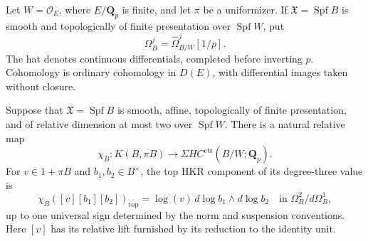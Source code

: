 Let $W=\mathcal O_E$, where $E/\mathbf Q_p$ is finite, and let $\pi$
be a uniformizer. If $\mathfrak X=\operatorname{Spf}B$ is smooth and
topologically of finite presentation over $\operatorname{Spf}W$, put
\[
 \Omega_B^j=\widehat\Omega^j_{B/W}[1/p].
\]
The hat denotes continuous differentials, completed before inverting
$p$. Cohomology is ordinary cohomology in $D(E)$, with differential images taken without closure.

\begin{lemma}
\label{d3:lem:relativelogproduct}
Suppose that $\mathfrak X=\operatorname{Spf}B$ is smooth, affine,
topologically of finite presentation, and of relative dimension at
most two over $\operatorname{Spf}W$. There is a natural relative map
\[
 \chi_B:K(B,\pi B)\longrightarrow
                  \Sigma HC^{\mathrm{cts}}(B/W;\mathbf Q_p).
\]
For $v\in1+\pi B$ and $b_1,b_2\in B^\times$, the top HKR component
of its degree-three value is
\begin{equation}\label{d3:eq:tcreviewlogproduct}
 \chi_B([v][b_1][b_2])_{\mathrm{top}}
   =\log(v)\,d\log b_1\wedge d\log b_2
       \quad\text{in }\Omega_B^2/d\Omega_B^1,
\end{equation}
up to one universal sign determined by the norm and suspension
conventions. Here $[v]$ has its relative lift furnished by its reduction
to the identity unit.
\end{lemma}

